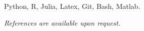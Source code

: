 \documentclass[
  date,
  number,
]{wgu-cv}
\begin{document}

Python,
R,
Julia,
Latex,
Git,
Bash,
Matlab.



\emph{References are available upon request.}



\end{document}
